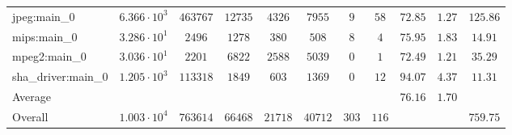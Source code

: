 \begin{tabular}{|l|c|c|c|c|c|c|c|c|c|c|}
jpeg:main\_0            & $ 6.366 \cdot 10^{3} $ & $ 463767 $ & $ 12735 $ & $ 4326  $ & $ 7955  $ & $ 9   $ & $ 58  $ & $ 72.85       $ & $ 1.27    $ & $ 125.86  $ \\
mips:main\_0            & $ 3.286 \cdot 10^{1} $ & $ 2496   $ & $ 1278  $ & $ 380   $ & $ 508   $ & $ 8   $ & $ 4   $ & $ 75.95       $ & $ 1.83    $ & $ 14.91   $ \\
mpeg2:main\_0           & $ 3.036 \cdot 10^{1} $ & $ 2201   $ & $ 6822  $ & $ 2588  $ & $ 5039  $ & $ 0   $ & $ 1   $ & $ 72.49       $ & $ 1.21    $ & $ 35.29   $ \\
sha\_driver:main\_0     & $ 1.205 \cdot 10^{3} $ & $ 113318 $ & $ 1849  $ & $ 603   $ & $ 1369  $ & $ 0   $ & $ 12  $ & $ 94.07       $ & $ 4.37    $ & $ 11.31   $ \\
\hline
Average                 & $                    $ & $        $ & $       $ & $       $ & $       $ & $     $ & $     $ & $ 76.16       $ & $ 1.70    $ & $         $ \\
\hline
Overall                 & $ 1.003 \cdot 10^{4} $ & $ 763614 $ & $ 66468 $ & $ 21718 $ & $ 40712 $ & $ 303 $ & $ 116 $ & $             $ & $         $ & $ 759.75  $ \\
\hline
\end{tabular}
